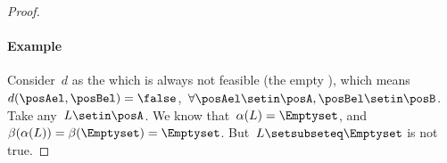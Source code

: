{\begin{proof}
        \paragraph{Example}
        Consider~$d$ as the  which is always not feasible (the empty ), which means~$d(\posAel,\posBel)=\false$,~$\forall \posAel\setin \posA,\posBel\setin \posB$.
        Take any~$L\setin \posA$.
        We know that~$\alpha(L)=\Emptyset$, and~$\beta(\alpha(L))=\beta(\Emptyset)=\Emptyset$.
        But~$L\setsubseteq \Emptyset$ is not true.
    \end{proof}

}